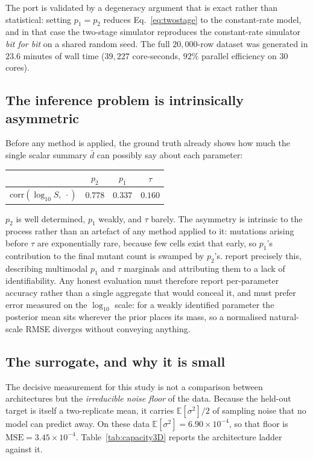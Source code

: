 \documentclass[sn-basic,iicol,pdflatex]{sn-jnl}
\newcommand{\dbar}{\ensuremath{\bar d}}
\begin{document}
The port is validated by a degeneracy argument that is exact rather than
statistical: setting $p_1 = p_2$ reduces Eq.~\eqref{eq:twostage} to the
constant-rate model, and in that case the two-stage simulator reproduces the
constant-rate simulator \emph{bit for bit} on a shared random seed. The full
$20{,}000$-row dataset was generated in $23.6$ minutes of wall time
($39{,}227$ core-seconds, $92\%$ parallel efficiency on 30 cores).

\subsection{The inference problem is intrinsically asymmetric}
\label{sec:sim3D_identifiability}

Before any method is applied, the ground truth already shows how much the single
scalar summary $\dbar$ can possibly say about each parameter:

\begin{center}
\begin{tabular}{lccc}
\toprule
 & $p_2$ & $p_1$ & $\tau$ \\
\midrule
$\mathrm{corr}\!\left(\log_{10}S,\ \cdot\right)$ & $0.778$ & $0.337$ & $0.160$ \\
\bottomrule
\end{tabular}
\end{center}

$p_2$ is well determined, $p_1$ weakly, and $\tau$ barely. The asymmetry is
intrinsic to the process rather than an artefact of any method applied to it:
mutations arising before $\tau$ are exponentially rare, because few cells exist
that early, so $p_1$'s contribution to the final mutant count is swamped by
$p_2$'s. \citeauthor{lu2023} report precisely this, describing
multimodal $p_1$ and $\tau$ marginals and attributing them to a lack of
identifiability. Any honest evaluation must therefore report per-parameter
accuracy rather than a single aggregate that would conceal it, and must prefer
error measured on the $\log_{10}$ scale: for a weakly identified parameter the
posterior mean sits wherever the prior places its mass, so a normalised
natural-scale RMSE diverges without conveying anything.

\subsection{The surrogate, and why it is small}
\label{sec:arch3D}

The decisive measurement for this study is not a comparison between
architectures but the \emph{irreducible noise floor} of the data. Because the
held-out target is itself a two-replicate mean, it carries $\mathbb{E}[\sigma^2]/2$
of sampling noise that no model can predict away. On these data
$\mathbb{E}[\sigma^2] = 6.90\times10^{-4}$, so that floor is
$\mathrm{MSE} = 3.45\times10^{-4}$. Table~\ref{tab:capacity3D} reports the
architecture ladder against it.
\end{document}
